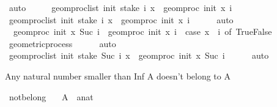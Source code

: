 \begin{isabellebody}
\ auto\isanewline
\ \ \isamarkupfalse%
\ \isamarkupfalse%
\ {\isachardoublequoteopen}geom{\isacharunderscore}{\kern0pt}proc{\isacharunderscore}{\kern0pt}list\ init\ {\isacharparenleft}{\kern0pt}stake\ i\ x{\isacharparenright}{\kern0pt}\ {\isacharequal}{\kern0pt}\ geom{\isacharunderscore}{\kern0pt}proc\ init\ x\ i{\isachardoublequoteclose}\isanewline
\ \ \ \ \isamarkupfalse%
\ {\isacartoucheopen}geom{\isacharunderscore}{\kern0pt}proc{\isacharunderscore}{\kern0pt}list\ init\ {\isacharparenleft}{\kern0pt}stake\ i\ x{\isacharparenright}{\kern0pt}\ {\isacharequal}{\kern0pt}\ geom{\isacharunderscore}{\kern0pt}proc\ init\ x\ i{\isacartoucheclose}\isanewline
\ \ \ \ \isamarkupfalse%
\ auto\isanewline
\ \ \isamarkupfalse%
\ \isamarkupfalse%
\ {\isachardoublequoteopen}\ geom{\isacharunderscore}{\kern0pt}proc\ init\ x\ {\isacharparenleft}{\kern0pt}Suc\ i{\isacharparenright}{\kern0pt}\ {\isacharequal}{\kern0pt}\ geom{\isacharunderscore}{\kern0pt}proc\ init\ x\ i\ {\isacharplus}{\kern0pt}\ {\isacharparenleft}{\kern0pt}case\ x\ {\isacharbang}{\kern0pt}{\isacharbang}{\kern0pt}\ i\ of\ True{\isasymRightarrow}{}{\isacharbar}{\kern0pt}False{\isasymRightarrow}\ {\isacharminus}{\kern0pt}{}{\isacharparenright}{\kern0pt}{\isachardoublequoteclose}\isanewline
\ \ \ \ \isamarkupfalse%
\ geometric{\isacharunderscore}{\kern0pt}process\isanewline
\ \ \ \ \isamarkupfalse%
\ auto\isanewline
\ \ \isamarkupfalse%
\ \isamarkupfalse%
\ {\isachardoublequoteopen}geom{\isacharunderscore}{\kern0pt}proc{\isacharunderscore}{\kern0pt}list\ init\ {\isacharparenleft}{\kern0pt}stake\ {\isacharparenleft}{\kern0pt}Suc\ i{\isacharparenright}{\kern0pt}\ x{\isacharparenright}{\kern0pt}\ {\isacharequal}{\kern0pt}\ geom{\isacharunderscore}{\kern0pt}proc\ init\ x\ {\isacharparenleft}{\kern0pt}Suc\ i{\isacharparenright}{\kern0pt}{\isachardoublequoteclose}\isanewline
\ \ \ \ \isamarkupfalse%
\ auto\isanewline
{}\isamarkupfalse%
%
\endisatagproof
{\isafoldproof}%
%
\isadelimproof
%
\endisadelimproof
%
\begin{isamarkuptext}%
Any natural number smaller than Inf A doesn't belong to A%
\end{isamarkuptext}\isamarkuptrue%
\isamarkupfalse%
\ not{\isacharunderscore}{\kern0pt}belong{\isacharcolon}{\kern0pt}\isanewline
\ \ \ A\ \ a{\isacharcolon}{\kern0pt}{\isacharcolon}{\kern0pt}nat\isanewline

\end{isabellebody}
